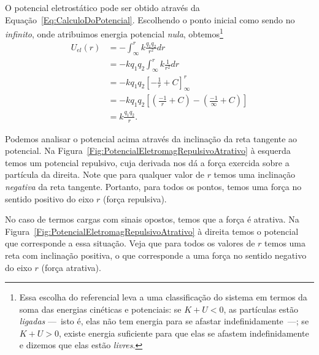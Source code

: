 O potencial eletrostático  pode ser obtido através da Equação~\ref{Eq:CalculoDoPotencial}. Escolhendo o ponto inicial como sendo no \emph{infinito}, onde atribuimos energia potencial \emph{nula}, obtemos\footnote{Essa escolha do referencial leva a uma classificação do sistema em termos da soma das energias cinéticas e potenciais: se $K + U < 0$, as partículas estão \emph{ligadas} ---~isto é, elas não tem energia para se afastar indefinidamente~---; se $K + U > 0$, existe energia suficiente para que elas se afastem indefinidamente e dizemos que elas estão \emph{livres}.} 
\begin{align}
    U_{el}(r) &= - \int_\infty^r k\frac{q_1q_2}{r^2} dr \\
    &= -k q_1 q_2 \int_\infty^r k\frac{1}{r^2} dr \\
    &= -k q_1 q_2 \left[-\frac{1}{r} + C\right]_\infty^r \\
    &= -k q_1 q_2 \left[\left(\frac{-1}{r} + C \right) - \left(\frac{-1}{\infty} + C\right)\right] \\
    &= k\frac{q_1 q_2}{r}.
\end{align}

Podemos analisar o potencial acima através da inclinação da reta tangente ao potencial. Na Figura~\ref{Fig:PotencialEletromagRepulsivoAtrativo} à esquerda temos um potencial repulsivo, cuja derivada nos dá a força exercida sobre a partícula da direita. Note que para qualquer valor de $r$ temos uma inclinação \emph{negativa} da reta tangente. Portanto, para todos os pontos, temos uma força no sentido positivo do eixo $r$ (força repulsiva).

No caso de termos cargas com sinais opostos, temos que a força é atrativa. Na Figura~\ref{Fig:PotencialEletromagRepulsivoAtrativo} à direita temos o potencial que corresponde a essa situação. Veja que para todos os valores de $r$ temos uma reta com inclinação positiva, o que corresponde a uma força no sentido negativo do eixo $r$ (força atrativa).

